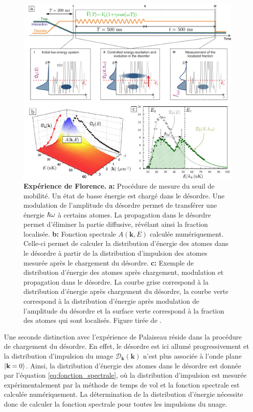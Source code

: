 \begin{figure}
\centering
\includegraphics[width=\textwidth]{Fig/Localisation/experience_florence.pdf}
\caption{\textbf{Expérience de Florence.} \textbf{a:} Procédure de mesure du seuil de mobilité. Un état de basse énergie est chargé dans le désordre. Une modulation de l'amplitude du désordre permet de transférer une énergie $\hslash \omega$ à certains atomes. La propagation dans le désordre permet d'éliminer la partie diffusive, révélant ainsi la fraction localisée. \textbf{b:} Fonction spectrale $A(\mathbf{k},E)$ calculée numériquement. Celle-ci permet de calculer la distribution d'énergie des atomes dans le désordre à partir de la distribution d'impulsion des atomes mesurée après le chargement du désordre. \textbf{c:} Exemple de distribution d'énergie des atomes après chargement, modulation et propagation dans le désordre. La courbe grise correspond à la distribution d'énergie après chargement du désordre, la courbe verte correspond à la distribution d'énergie après modulation de l'amplitude du désordre et la surface verte correspond à la fraction des atomes qui sont localisés. Figure tirée de \citep{denechaud2018vers}.}
\label{fig:experience_florence}
\end{figure}

Une seconde distinction avec l'expérience de Palaiseau réside dans la procédure de chargement du désordre. En effet, le désordre est ici allumé progressivement et la distribution d'impulsion du nuage $\mathcal{D}_{\mathbf{k}}(\mathbf{k})$ n'est plus associée à l'onde plane $\left| \mathbf{k}=0 \right\rangle$. Ainsi, la distribution d'énergie des atomes dans le désordre est donnée par l'équation \ref{eq:fonction_spectrale}, où la distribution d'impulsion est mesurée expérimentalement par la méthode de temps de vol et la fonction spectrale est calculée numériquement. La détermination de la distribution d'énergie nécessite donc de calculer la fonction spectrale pour toutes les impulsions du nuage.

